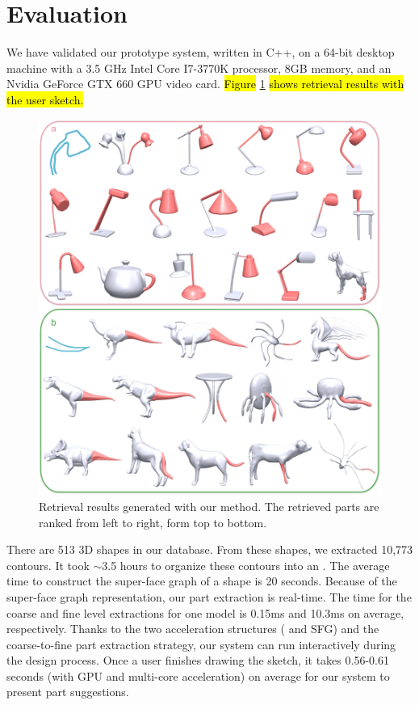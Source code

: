 

\section{Evaluation}

We have validated our prototype system, written in C++, on a 64-bit desktop machine with a 3.5 GHz Intel Core I7-3770K processor, 8GB memory, and an Nvidia GeForce GTX 660 GPU video card. \hl{Figure }\ref{fig:MoreRetrievalRes}\hl{ shows retrieval results with the user sketch.}

\begin{figure}\centering
\includegraphics[width=1.05\linewidth]{./Material/MoreRetrievalRes.pdf}
\caption{Retrieval results generated with our method. The retrieved parts are ranked from left to right, form top to bottom.}\label{fig:MoreRetrievalRes}
\end{figure}

There are 513 3D shapes in our database. From these shapes, we extracted 10,773 contours. It took $\sim$3.5 hours to organize these contours into an {\RCKNNG}. The average time to construct the super-face graph of a shape is 20 seconds. Because of the super-face graph representation, our part extraction is real-time. The time for the coarse and fine level extractions for one model is 0.15ms and 10.3ms on average, respectively. Thanks to the two acceleration structures ({\RCKNNG} and SFG) and the coarse-to-fine part extraction strategy, our system can run interactively during the design process. Once a user finishes drawing the sketch, it takes 0.56-0.61 seconds (with GPU and multi-core acceleration) on average for our system to present part suggestions.


